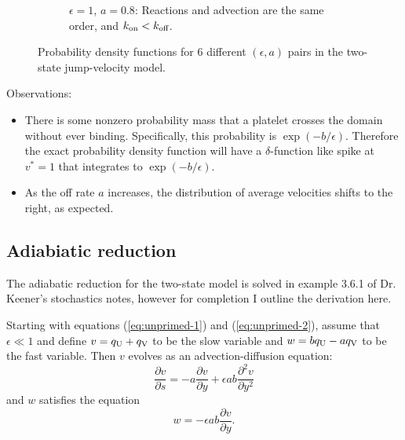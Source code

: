 \documentclass{article}
\newcommand{\tn}{\textnormal}
\newcommand{\Pder}[2]{\frac{\partial #1}{\partial #2}}
\begin{document}
\begin{figure}
\begin{subfigure}{0.48\textwidth}
    \caption{$\epsilon = 1$, $a = 0.8$: Reactions and advection are
      the same order, and $k_\tn{on} < k_\tn{off}$.}
  \end{subfigure}
  \caption[Probability density functions]{Probability density
    functions for 6 different $(\epsilon, a)$ pairs in the two-state
    jump-velocity model.}
  \label{fig:prob-dens}
\end{figure}

Observations:
\begin{itemize}
\item There is some nonzero probability mass that a platelet crosses
  the domain without ever binding. Specifically, this probability is
  $\exp(-b/\epsilon)$. Therefore the exact probability density
  function will have a $\delta$-function like spike at $v^* = 1$ that
  integrates to $\exp(-b/\epsilon)$.
\item As the off rate $a$ increases, the distribution of average
  velocities shifts to the right, as expected.
\end{itemize}

\subsection{Adiabiatic reduction}
\label{sec:adiabiatic-reduction}

The adiabatic reduction for the two-state model is solved in example
3.6.1 of Dr. Keener's stochastics notes, however for completion I
outline the derivation here.

Starting with equations (\ref{eq:unprimed-1}) and
(\ref{eq:unprimed-2}), assume that $\epsilon \ll 1$ and define
$v = q_\tn{U} + q_\tn{V}$ to be the slow variable and
$w = b q_\tn{U} - a q_\tn{V}$ to be the fast variable. Then $v$
evolves as an advection-diffusion equation:
\begin{equation}
  \label{eq:v}
  \Pder{v}{s} = -a \Pder{v}{y} + \epsilon a b \frac{\partial^2
    v}{\partial y^2}
\end{equation}
and $w$ satisfies the equation
\begin{equation}
  \label{eq:w}
  w = -\epsilon a b \Pder{v}{y}.
\end{equation}
\end{document}
